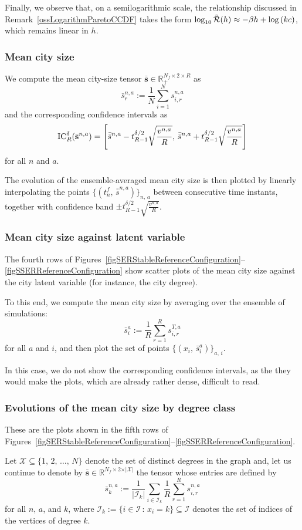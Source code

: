 \documentclass[a4paper]{article}
\newcommand{\R}{\mathbb{R}}
\begin{document}
Finally, we observe that, on a semilogarithmic scale, the relationship discussed in Remark~\ref{ossLogarithmParetoCCDF} takes the form $\log_{10}{\tilde{\operatorname{\mathcal R}}(h)}\approx-\beta h+\log{(kc)}$, which remains linear in $h$.

\subsubsection{Mean city size}
We compute the mean city-size tensor $\bar{\mathbf s}\in\R_+^{N_f\times2\times R}$ as
$$ \bar s^{n,a}_r:=\frac{1}{N}\sum_{i=1}^Ns^{n,a}_{i,r} $$
and the corresponding confidence intervals as
$$ \operatorname{IC}_R^{\delta}(\bar{\mathbf s}^{n,a})=\left[\bar{\bar s}^{n,a}-t^{\delta/2}_{R-1}\sqrt{\frac{v^{n,a}}{R}},\,\bar{\bar s}^{n,a}+t^{\delta/2}_{R-1}\sqrt{\frac{v^{n,a}}{R}}\right] $$
for all $n$ and $a$.

The evolution of the ensemble-averaged mean city size is then plotted by linearly interpolating the points $\{(t^f_n,\,\bar{\bar s}^{n,a})\}_{n,\,a}$ between consecutive time instants, together with confidence band $\pm t^{\delta/2}_{R-1}\sqrt{\frac{v^{n,a}}{R}}$.
        
\subsubsection{Mean city size against latent variable}
\label{secMeanCitySizevsLatentVariable}
%
The fourth rows of Figures~\ref{figSERStableReferenceConfiguration}--\ref{figSSERReferenceConfiguration} show scatter plots of the mean city size against the city latent variable (for instance, the city degree).

To this end, we compute the mean city size by averaging over the ensemble of simulations:
$$ \bar s^a_i:=\frac{1}{R}\sum_{r=1}^Rs^{T,a}_{i,r} $$
for all $a$ and $i$, and then plot the set of points $\{(x_i,\,\bar s^a_i)\}_{a,\,i}$.

In this case, we do not show the corresponding confidence intervals, as the they would make the plots, which are already rather dense, difficult to read.
        
\subsubsection{Evolutions of the mean city size by degree class}
These are the plots shown in the fifth rows of Figures~\ref{figSERStableReferenceConfiguration}--\ref{figSSERReferenceConfiguration}.

Let $\mathcal X\subseteq\{1,\,2,\,\dots,\,N\}$ denote the set of distinct degrees in the graph and, let us continue to denote by $\bar{\mathbf s}\in\R^{N_f\times 2\times\vert\mathcal X\vert}$ the tensor whose entries are defined by
$$ \bar s^{n,a}_k:=\frac1{\vert\mathcal I_k\vert}\sum_{i\in\mathcal I_k}\frac{1}{R}\sum_{r=1}^Rs^{n,a}_{i,r} $$
for all $n$, $a$, and $k$, where $\mathcal I_k:=\{i\in\mathcal I\,:\,x_i=k\}\subseteq\mathcal I$ denotes the set of indices of the vertices of degree $k$.
\end{document}

